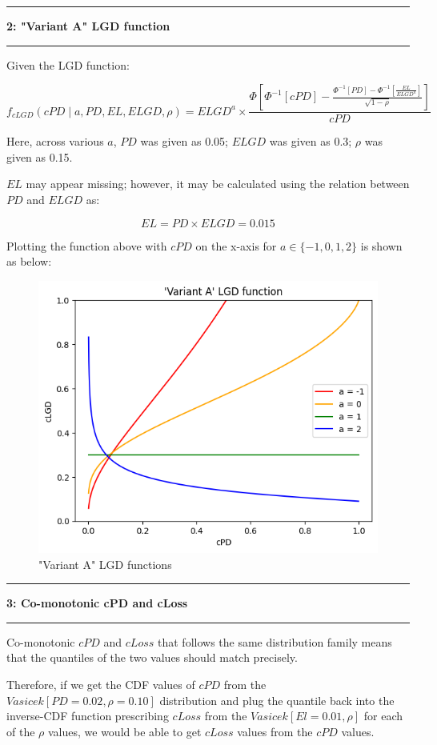 \documentclass[11pt]{article}
\newcommand\question[2]{\vspace{.25in}\hrule\textbf{#1: #2}\vspace{.5em}\hrule\vspace{.10in}}
\begin{document}
\newpage

\question{2}{"Variant A" LGD function}

Given the LGD function:

$$
f_{cLGD}(cPD \mid a, PD, EL, ELGD, \rho) = 
ELGD^a \times
\frac{
\Phi \left[
\Phi^{-1}[cPD]
- \frac{\Phi^{-1}[PD]
- \Phi^{-1}[\frac{EL}{ELGD^a}]}
{\sqrt{1 - \rho}}
\right]
}
{cPD}
$$

Here, across various $a$, $PD$ was given as 0.05;
$ELGD$ was given as 0.3; $\rho$ was given as 0.15.

$EL$ may appear missing; however, it may be calculated 
using the relation between $PD$ and $ELGD$ as:

$$
EL = PD \times ELGD = 0.015
$$

Plotting the function above with $cPD$ on the x-axis
for $a \in \{-1, 0, 1, 2\}$ is shown as below:

\begin{figure}[h]
\centering
\includegraphics[scale=0.8]{Q2.png}
\caption{"Variant A" LGD functions}
\label{Fig:Q1}
\end{figure}


\newpage

\question{3}{Co-monotonic cPD and cLoss}

Co-monotonic $cPD$ and $cLoss$ that follows the same
distribution family means that the quantiles of the 
two values should match precisely.

Therefore, if we get the CDF values of $cPD$ from
the $Vasicek[PD = 0.02, \rho = 0.10]$ distribution
and plug the quantile back into the inverse-CDF function
prescribing $cLoss$ from the $Vasicek[El = 0.01, \rho]$
for each of the $\rho$ values, we would be able to get
$cLoss$ values from the $cPD$ values.
\end{document}
